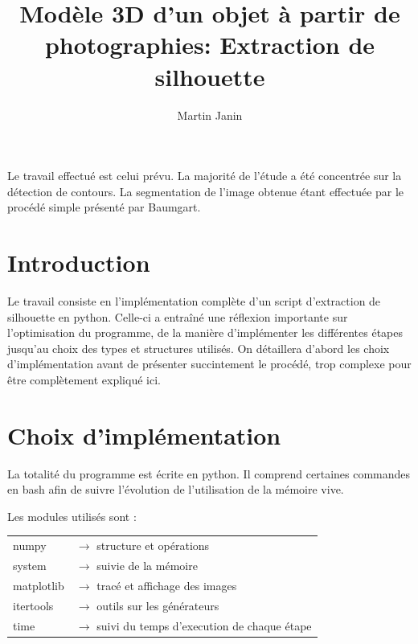 \documentclass{article}
\author{Martin Janin}
\title{Modèle 3D d'un objet à partir de photographies: Extraction de silhouette}
\begin{document}
\maketitle

Le travail effectué est celui prévu. La majorité de l'étude a été concentrée sur la détection de contours. La segmentation de l'image obtenue étant effectuée par le procédé simple présenté par Baumgart.

\noindent\makebox[\linewidth]{\rule{\textwidth}{0.4pt}}
\vspace{-0.8cm}
\tableofcontents
\noindent\makebox[\linewidth]{\rule{\textwidth}{0.4pt}}

\bigskip
\bigskip

\begin{multicols}{2}

\section{Introduction}

Le travail consiste en l'implémentation complète d'un script d'extraction de silhouette en python. Celle-ci a entraîné une réflexion importante sur l'optimisation du programme, de la manière d'implémenter les différentes étapes jusqu'au choix des types et structures utilisés. On détaillera d'abord les choix d'implémentation avant de présenter succintement le procédé, trop complexe pour être complètement expliqué ici.

\section{Choix d'implémentation}

La totalité du programme est écrite en python. Il comprend certaines commandes en bash afin de suivre l'évolution de l'utilisation de la mémoire vive.

Les modules utilisés sont :

\begin{tabular}{l p{5cm}}
	numpy & $\longrightarrow$ structure et opérations \\
	system & $\longrightarrow$ suivie de la mémoire \\
	matplotlib & $\longrightarrow$ tracé et affichage des images \\
	itertools & $\longrightarrow$ outils sur les générateurs \\
	time & $\longrightarrow$ suivi du temps d'execution de chaque étape
\end{tabular}


\end{multicols}
\end{document}

